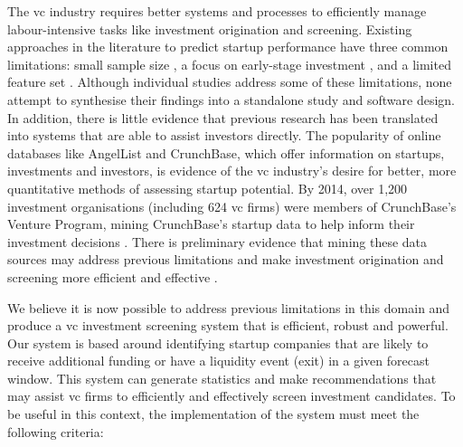 \documentclass[../thesis/thesis.tex]{subfiles}
\begin{document}
The \gls{vc} industry requires better systems and processes to efficiently manage labour-intensive tasks like investment origination and screening. Existing approaches in the literature to predict startup performance have three common limitations: small sample size \cite{ahlers2015, gimmon2010, dixon2014, hoenen2014, yu2015, an2015, werth2013, croce2016}, a focus on early-stage investment \cite{beckwith2016, ahlers2015, cheng2016, yuan2016, croce2016, stone2014}, and a limited feature set \cite{ahlers2015, an2015, cheng2016, croce2016, werth2013, gimmon2010}. Although individual studies address some of these limitations, none attempt to synthesise their findings into a standalone study and software design. In addition, there is little evidence that previous research has been translated into systems that are able to assist investors directly. The popularity of online databases like AngelList and CrunchBase, which offer information on startups, investments and investors, is evidence of the \gls{vc} industry's desire for better, more quantitative methods of assessing startup potential. By 2014, over 1,200 investment organisations (including 624 \gls{vc} firms) were members of CrunchBase's Venture Program, mining CrunchBase's startup data to help inform their investment decisions \cite{patil2015}. There is preliminary evidence that mining these data sources may address previous limitations and make investment origination and screening more efficient and effective \cite{stone2014,bhat2011}.

We believe it is now possible to address previous limitations in this domain and produce a \gls{vc} investment screening system that is efficient, robust and powerful. Our system is based around identifying startup companies that are likely to receive additional funding or have a liquidity event (exit) in a given forecast window. This system can generate statistics and make recommendations that may assist \gls{vc} firms to efficiently and effectively screen investment candidates. To be useful in this context, the implementation of the system must meet the following criteria:
\end{document}
